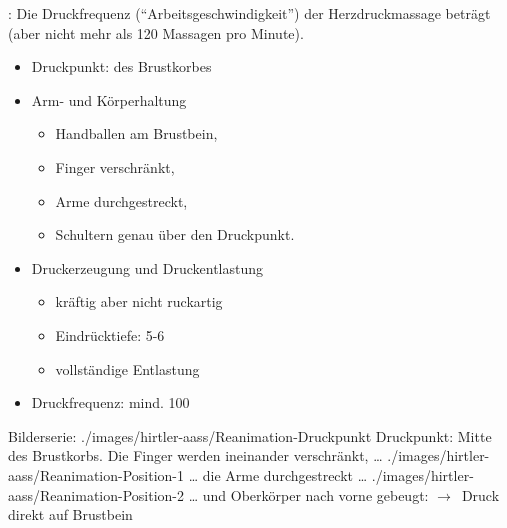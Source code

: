 {%

: Die Druckfrequenz
(\enquote{Arbeitsgeschwindigkeit}) der Herzdruckmassage
beträgt  (aber nicht mehr als
120 Massagen pro Minute).

}{
\begin{itemize}
  \item Druckpunkt:  des Brustkorbes
  \item Arm- und Körperhaltung
  \begin{itemize}
    \item Handballen am Brustbein,
    \item Finger verschränkt,
    \item Arme durchgestreckt,
    \item Schultern genau über den Druckpunkt.
  \end{itemize}
  \item Druckerzeugung und Druckentlastung
  \begin{itemize}
    \item kräftig aber nicht ruckartig
    \item Eindrücktiefe: 5-6\CM*
    \item vollständige Entlastung
  \end{itemize}
  \item Druckfrequenz: mind. 100\PerMin*
\end{itemize}
}{}{}{}

\begin{PictureSeries}{}{Bilderserie:  }
{./images/hirtler-aass/Reanimation-Druckpunkt}
{Druckpunkt: Mitte des Brustkorbs. Die Finger werden
ineinander verschränkt, \ldots}
{./images/hirtler-aass/Reanimation-Position-1}
{{\ldots} die Arme durchgestreckt \ldots}
{./images/hirtler-aass/Reanimation-Position-2}
{{\ldots} und Oberkörper nach vorne gebeugt:
$\rightarrow$~Druck direkt auf Brustbein}
{}
{}
\end{PictureSeries}



